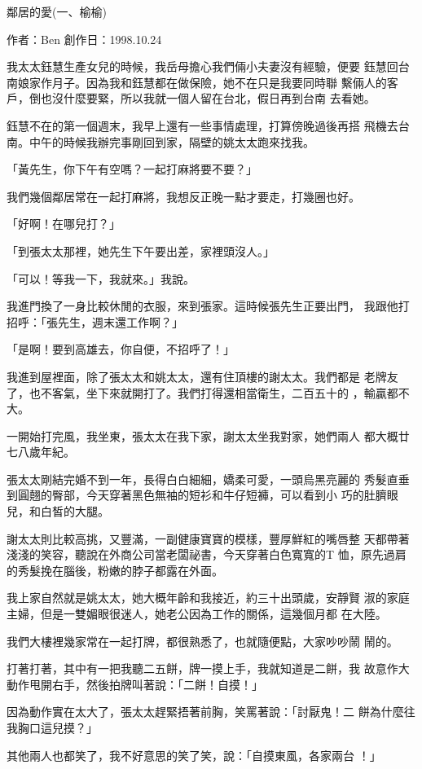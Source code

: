 鄰居的愛(一、榆榆)

作者：Ben
創作日：1998.10.24

我太太鈺慧生產女兒的時候，我岳母擔心我們倆小夫妻沒有經驗，便要
鈺慧回台南娘家作月子。因為我和鈺慧都在做保險，她不在只是我要同時聯
繫倆人的客戶，倒也沒什麼要緊，所以我就一個人留在台北，假日再到台南
去看她。

鈺慧不在的第一個週末，我早上還有一些事情處理，打算傍晚過後再搭
飛機去台南。中午的時候我辦完事剛回到家，隔壁的姚太太跑來找我。

「黃先生，你下午有空嗎？一起打麻將要不要？」

我們幾個鄰居常在一起打麻將，我想反正晚一點才要走，打幾圈也好。

「好啊！在哪兒打？」

「到張太太那裡，她先生下午要出差，家裡頭沒人。」

「可以！等我一下，我就來。」我說。

我進門換了一身比較休閒的衣服，來到張家。這時候張先生正要出門，
我跟他打招呼：「張先生，週末還工作啊？」

「是啊！要到高雄去，你自便，不招呼了！」

我進到屋裡面，除了張太太和姚太太，還有住頂樓的謝太太。我們都是
老牌友了，也不客氣，坐下來就開打了。我們打得還相當衛生，二百五十的
，輸贏都不大。

一開始打完風，我坐東，張太太在我下家，謝太太坐我對家，她們兩人
都大概廿七八歲年紀。

張太太剛結完婚不到一年，長得白白細細，嬌柔可愛，一頭烏黑亮麗的
秀髮直垂到圓翹的臀部，今天穿著黑色無袖的短衫和牛仔短褲，可以看到小
巧的肚臍眼兒，和白皙的大腿。

謝太太則比較高挑，又豐滿，一副健康寶寶的模樣，豐厚鮮紅的嘴唇整
天都帶著淺淺的笑容，聽說在外商公司當老闆祕書，今天穿著白色寬寬的T
恤，原先過肩的秀髮挽在腦後，粉嫩的脖子都露在外面。

我上家自然就是姚太太，她大概年齡和我接近，約三十出頭歲，安靜賢
淑的家庭主婦，但是一雙媚眼很迷人，她老公因為工作的關係，這幾個月都
在大陸。

我們大樓裡幾家常在一起打牌，都很熟悉了，也就隨便點，大家吵吵鬧
鬧的。

打著打著，其中有一把我聽二五餅，牌一摸上手，我就知道是二餅，我
故意作大動作甩開右手，然後拍牌叫著說：「二餅！自摸！」

因為動作實在太大了，張太太趕緊捂著前胸，笑罵著說：「討厭鬼！二
餅為什麼往我胸口這兒摸？」

其他兩人也都笑了，我不好意思的笑了笑，說：「自摸東風，各家兩台
！」

